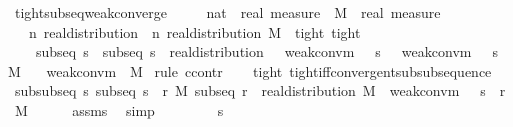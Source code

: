 \documentclass{article}
\theoremstyle{definition}
\begin{document}
\begin{isabellebody}
\isamarkupfalse%
\ tight{\isacharunderscore}subseq{\isacharunderscore}weak{\isacharunderscore}converge{\isacharcolon}\isanewline
\ \ \ {\isasymmu}\ {\isacharcolon}{\isacharcolon}\ {\isachardoublequoteopen}nat\ {\isasymRightarrow}\ real\ measure{\isachardoublequoteclose}\ \ M\ {\isacharcolon}{\isacharcolon}\ {\isachardoublequoteopen}real\ measure{\isachardoublequoteclose}\isanewline
\ \ \ {\isachardoublequoteopen}{\isasymAnd}n{\isachardot}\ real{\isacharunderscore}distribution\ {\isacharparenleft}{\isasymmu}\ n{\isacharparenright}{\isachardoublequoteclose}\ {\isachardoublequoteopen}real{\isacharunderscore}distribution\ M{\isachardoublequoteclose}\ \ tight{\isacharcolon}\ {\isachardoublequoteopen}tight\ {\isasymmu}{\isachardoublequoteclose}\ \isanewline
\ \ \ \ subseq{\isacharcolon}\ {\isachardoublequoteopen}{\isasymAnd}s\ {\isasymnu}{\isachardot}\ subseq\ s\ {\isasymLongrightarrow}\ real{\isacharunderscore}distribution\ {\isasymnu}\ {\isasymLongrightarrow}\ weak{\isacharunderscore}conv{\isacharunderscore}m\ {\isacharparenleft}{\isasymmu}\ {\isasymcirc}\ s{\isacharparenright}\ {\isasymnu}\ {\isasymLongrightarrow}\ weak{\isacharunderscore}conv{\isacharunderscore}m\ {\isacharparenleft}{\isasymmu}\ {\isasymcirc}\ s{\isacharparenright}\ M{\isachardoublequoteclose}\isanewline
\ \ \ {\isachardoublequoteopen}weak{\isacharunderscore}conv{\isacharunderscore}m\ {\isasymmu}\ M{\isachardoublequoteclose}\isanewline
{}\isamarkupfalse%
\ {\isacharparenleft}rule\ ccontr{\isacharparenright}\isanewline
\ \ \isamarkupfalse%
\ tight\ tight{\isacharunderscore}iff{\isacharunderscore}convergent{\isacharunderscore}subsubsequence\isanewline
\ \ \isamarkupfalse%
\ subsubseq{\isacharcolon}\ {\isachardoublequoteopen}{\isasymforall}s{\isachardot}\ subseq\ s\ {\isasymlongrightarrow}\ {\isacharparenleft}{\isasymexists}r\ M{\isachardot}\ subseq\ r\ {\isasymand}\ real{\isacharunderscore}distribution\ M\ {\isasymand}\ weak{\isacharunderscore}conv{\isacharunderscore}m\ {\isacharparenleft}{\isasymmu}\ {\isasymcirc}\ s\ {\isasymcirc}\ r{\isacharparenright}\ M{\isacharparenright}{\isachardoublequoteclose}\isanewline
\ \ \ \ \isamarkupfalse%
\ assms\ \isamarkupfalse%
\ simp\isanewline
\ \ \isacommand{{\isacharbraceleft}}\isamarkupfalse%
\isanewline
\ \ \ \ \isamarkupfalse%
\ s\ \isamarkupfalse%

\end{isabellebody}
\end{document}

